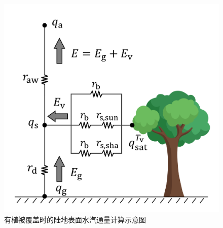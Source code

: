 {
  \begin{figure}[htbp]
    \centering
    \includegraphics[width=0.6\linewidth]{Figures/地表湍流交换过程/有植被潜热交换阻抗示意图_v2.png}
    \caption{有植被覆盖时的陆地表面水汽通量计算示意图}
    \label{fig:有植被覆盖部分的陆地表面水汽通量示意图}
  \end{figure}
}

